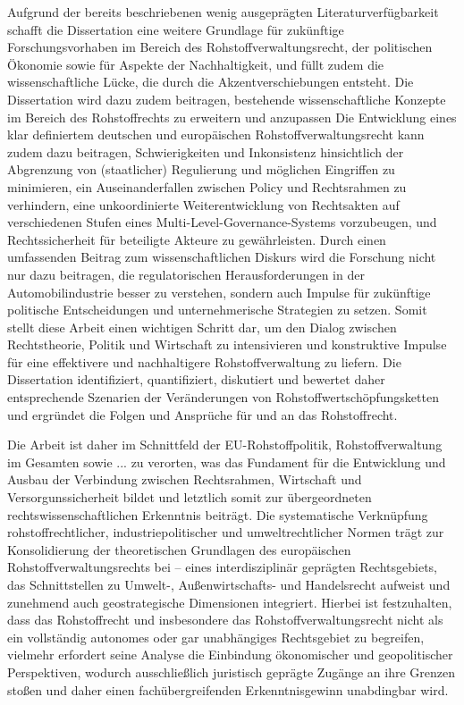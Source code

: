 \documentclass[12pt,a4paper,oneside]{book} %
\begin{document}
Aufgrund der bereits beschriebenen wenig ausgeprägten Literaturverfügbarkeit schafft die Dissertation eine weitere Grundlage für zukünftige Forschungsvorhaben im Bereich des Rohstoffverwaltungsrecht, der politischen Ökonomie sowie für Aspekte der Nachhaltigkeit, und füllt zudem die wissenschaftliche Lücke, die durch die Akzentverschiebungen entsteht. Die Dissertation wird dazu zudem beitragen, bestehende wissenschaftliche Konzepte im Bereich des Rohstoffrechts zu erweitern und anzupassen
Die Entwicklung eines klar definiertem deutschen und europäischen Rohstoffverwaltungsrecht kann zudem dazu beitragen, Schwierigkeiten und Inkonsistenz hinsichtlich der Abgrenzung von (staatlicher) Regulierung und möglichen Eingriffen zu minimieren, ein Auseinanderfallen zwischen Policy und Rechtsrahmen zu verhindern, eine unkoordinierte Weiterentwicklung von Rechtsakten auf verschiedenen Stufen eines Multi-Level-Governance-Systems vorzubeugen, und Rechtssicherheit für beteiligte Akteure zu gewährleisten. Durch einen umfassenden Beitrag zum wissenschaftlichen Diskurs wird die Forschung nicht nur dazu beitragen, die regulatorischen Herausforderungen in der Automobilindustrie besser zu verstehen, sondern auch Impulse für zukünftige politische Entscheidungen und unternehmerische Strategien zu setzen. Somit stellt diese Arbeit einen wichtigen Schritt dar, um den Dialog zwischen Rechtstheorie, Politik und Wirtschaft zu intensivieren und konstruktive Impulse für eine effektivere und nachhaltigere Rohstoffverwaltung zu liefern. Die Dissertation identifiziert, quantifiziert, diskutiert und bewertet daher entsprechende Szenarien der Veränderungen von Rohstoffwertschöpfungsketten und ergründet die Folgen und Ansprüche für und an das Rohstoffrecht.

Die Arbeit ist daher im Schnittfeld der EU-Rohstoffpolitik, Rohstoffverwaltung im Gesamten sowie ... zu verorten, was das Fundament für die Entwicklung und Ausbau der Verbindung zwischen Rechtsrahmen, Wirtschaft und Versorgunssicherheit bildet und letztlich somit zur übergeordneten rechtswissenschaftlichen Erkenntnis beiträgt. Die systematische Verknüpfung rohstoffrechtlicher, industriepolitischer und umweltrechtlicher Normen trägt zur Konsolidierung der theoretischen Grundlagen des europäischen Rohstoffverwaltungsrechts bei – eines interdisziplinär geprägten Rechtsgebiets, das Schnittstellen zu Umwelt-, Außenwirtschafts- und Handelsrecht aufweist und zunehmend auch geostrategische Dimensionen integriert. Hierbei ist festzuhalten, dass das Rohstoffrecht und insbesondere das Rohstoffverwaltungsrecht nicht als ein vollständig autonomes oder gar unabhängiges Rechtsgebiet zu begreifen, vielmehr erfordert seine Analyse die Einbindung ökonomischer und geopolitischer Perspektiven, wodurch ausschließlich juristisch geprägte Zugänge an ihre Grenzen stoßen und daher einen fachübergreifenden Erkenntnisgewinn unabdingbar wird.
\end{document}
